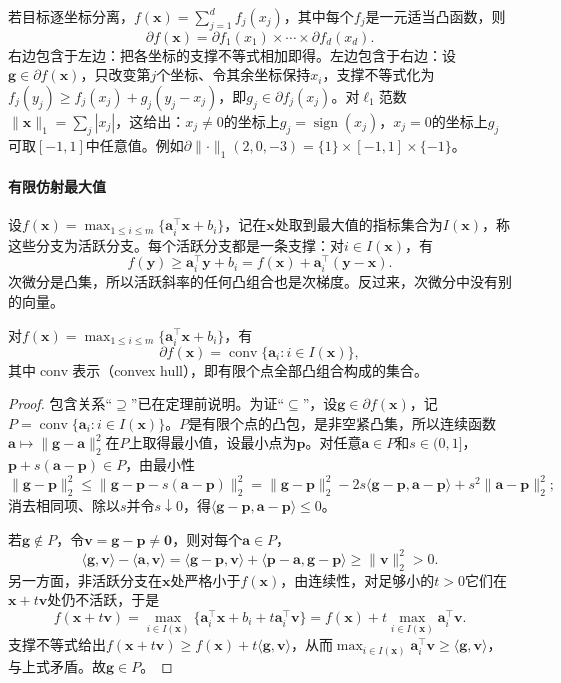 若目标逐坐标分离，$f(\bm x)=\sum_{j=1}^df_j(x_j)$，其中每个$f_j$是一元适当凸函数，则
\begin{equation}
 \partial f(\bm x)=\partial f_1(x_1)\times\cdots\times\partial f_d(x_d).
 \label{eq:opt-ns-separable-subdifferential}
\end{equation}
右边包含于左边：把各坐标的支撑不等式相加即得。左边包含于右边：设$\bm g\in\partial f(\bm x)$，只改变第$j$个坐标、令其余坐标保持$x_i$，支撑不等式化为$f_j(y_j)\geq f_j(x_j)+g_j(y_j-x_j)$，即$g_j\in\partial f_j(x_j)$。对$\ell_1$范数$\lVert\bm x\rVert_1=\sum_j|x_j|$，这给出：$x_j\neq0$的坐标上$g_j=\operatorname{sign}(x_j)$，$x_j=0$的坐标上$g_j$可取$[-1,1]$中任意值。例如$\partial\lVert\cdot\rVert_1(2,0,-3)=\{1\}\times[-1,1]\times\{-1\}$。

\paragraph{有限仿射最大值}
设$f(\bm x)=\max_{1\leq i\leq m}\{\bm a_i^\top\bm x+b_i\}$，记在$\bm x$处取到最大值的指标集合为$I(\bm x)$，称这些分支为活跃分支。每个活跃分支都是一条支撑：对$i\in I(\bm x)$，有
\[
 f(\bm y)\geq\bm a_i^\top\bm y+b_i=f(\bm x)+\bm a_i^\top(\bm y-\bm x).
\]
次微分是凸集，所以活跃斜率的任何凸组合也是次梯度。反过来，次微分中没有别的向量。

\begin{theorem}[最大值函数的次微分]
\label{thm:opt-ns-max-subdifferential}
对$f(\bm x)=\max_{1\leq i\leq m}\{\bm a_i^\top\bm x+b_i\}$，有
\[
 \partial f(\bm x)=\operatorname{conv}\{\bm a_i:i\in I(\bm x)\},
\]
其中$\operatorname{conv}$表示（convex hull），即有限个点全部凸组合构成的集合。
\end{theorem}

\begin{proof}
包含关系“$\supseteq$”已在定理前说明。为证“$\subseteq$”，设$\bm g\in\partial f(\bm x)$，记$P=\operatorname{conv}\{\bm a_i:i\in I(\bm x)\}$。$P$是有限个点的凸包，是非空紧凸集，所以连续函数$\bm a\mapsto\lVert\bm g-\bm a\rVert_2^2$在$P$上取得最小值，设最小点为$\bm p$。对任意$\bm a\in P$和$s\in(0,1]$，$\bm p+s(\bm a-\bm p)\in P$，由最小性
\[
 \lVert\bm g-\bm p\rVert_2^2\leq\lVert\bm g-\bm p-s(\bm a-\bm p)\rVert_2^2
 =\lVert\bm g-\bm p\rVert_2^2-2s\langle\bm g-\bm p,\bm a-\bm p\rangle+s^2\lVert\bm a-\bm p\rVert_2^2;
\]
消去相同项、除以$s$并令$s\downarrow0$，得$\langle\bm g-\bm p,\bm a-\bm p\rangle\leq0$。

若$\bm g\notin P$，令$\bm v=\bm g-\bm p\neq\bm 0$，则对每个$\bm a\in P$，
\[
 \langle\bm g,\bm v\rangle-\langle\bm a,\bm v\rangle
 =\langle\bm g-\bm p,\bm v\rangle+\langle\bm p-\bm a,\bm g-\bm p\rangle
 \geq\lVert\bm v\rVert_2^2>0.
\]
另一方面，非活跃分支在$\bm x$处严格小于$f(\bm x)$，由连续性，对足够小的$t>0$它们在$\bm x+t\bm v$处仍不活跃，于是
\[
 f(\bm x+t\bm v)=\max_{i\in I(\bm x)}\{\bm a_i^\top\bm x+b_i+t\bm a_i^\top\bm v\}=f(\bm x)+t\max_{i\in I(\bm x)}\bm a_i^\top\bm v.
\]
支撑不等式给出$f(\bm x+t\bm v)\geq f(\bm x)+t\langle\bm g,\bm v\rangle$，从而$\max_{i\in I(\bm x)}\bm a_i^\top\bm v\geq\langle\bm g,\bm v\rangle$，与上式矛盾。故$\bm g\in P$。
\end{proof}

